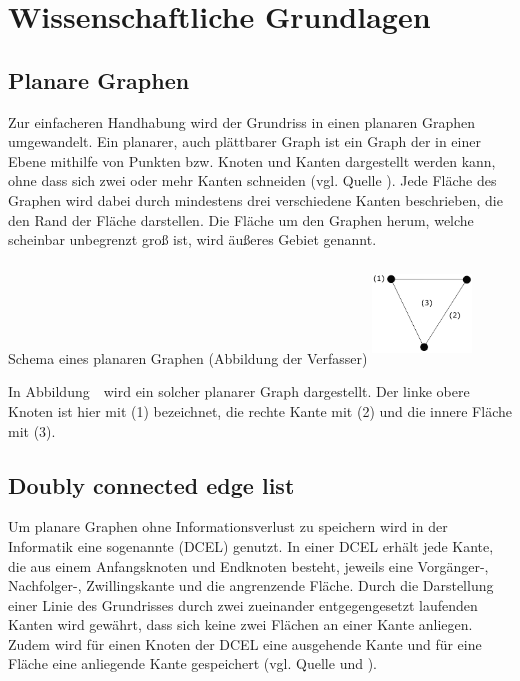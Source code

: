 \chapter{Wissenschaftliche Grundlagen}
\section{Planare Graphen}
Zur einfacheren Handhabung wird der Grundriss in einen planaren Graphen umgewandelt. 
Ein planarer, auch plättbarer Graph ist ein Graph der in einer Ebene mithilfe von Punkten bzw. Knoten und Kanten dargestellt werden kann, ohne dass sich zwei oder mehr Kanten schneiden (vgl. Quelle \cite{planarGraph}). 
Jede Fläche des Graphen wird dabei durch mindestens drei verschiedene Kanten beschrieben, die den Rand der Fläche darstellen. 
Die Fläche um den Graphen herum, welche scheinbar unbegrenzt groß ist, wird äußeres Gebiet genannt.
\begin{Bild}{Schema eines planaren Graphen (Abbildung der Verfasser)}
	\includegraphics[width = 100px, height = 100px]{Bilder/Graph_Scheme}
\end{Bild}
In Abbildung~\thebildnr\ wird ein solcher planarer Graph dargestellt.
Der linke obere Knoten ist hier mit (1) bezeichnet, die rechte Kante mit (2) und die innere Fläche mit (3).

\section{Doubly connected edge list}
Um planare Graphen ohne Informationsverlust zu speichern wird in der Informatik eine sogenannte  (DCEL) genutzt.
In einer DCEL erhält jede Kante, die aus einem Anfangsknoten und Endknoten besteht, jeweils eine Vorgänger-, Nachfolger-, Zwillingskante und die angrenzende Fläche. 
Durch die Darstellung einer Linie des Grundrisses durch zwei zueinander entgegengesetzt laufenden Kanten wird gewährt, dass sich keine zwei Flächen an einer Kante anliegen.\\
Zudem wird für einen Knoten der DCEL eine ausgehende Kante und für eine Fläche eine anliegende Kante gespeichert (vgl. Quelle \cite{dcel} und \cite{dcelwiki}). \\

